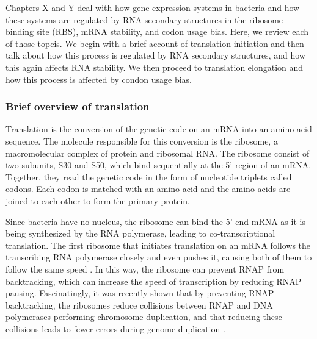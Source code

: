 %
Chapters X and Y deal with how gene expression systems in bacteria and how
these systems are regulated by RNA secondary structures in the ribosome binding
site (RBS), mRNA stability, and codon usage bias. Here, we review each of those
topcis. We begin with a brief account of translation initiation and then talk
about how this process is regulated by RNA secondary structures, and how this
again affects RNA stability. We then proceed to translation elongation and how
this process is affected by condon usage bias.

\subsubsection{Brief overview of translation}
Translation is the conversion of the genetic code on an mRNA into an amino acid
sequence. The molecule responsible for this conversion is the ribosome, a
macromolecular complex of protein and ribosomal RNA. The ribosome consist of
two subunits, S30 and S50, which bind sequentially at the 5' region of an mRNA.
Together, they read the genetic code in the form of nucleotide triplets called
codons. Each codon is matched with an amino acid and the amino acids are joined
to each other to form the primary protein.

Since bacteria have no nucleus, the ribosome can bind the 5' end mRNA as it is
being synthesized by the RNA polymerase, leading to co-transcriptional
translation. The first ribosome that initiates
translation on an mRNA follows the transcribing RNA polymerase closely and even
pushes it, causing both of them to follow the same speed 
\cite{proshkin_cooperation_2010}. In this way, the ribosome can prevent RNAP
from backtracking, which can increase the speed of transcription by reducing
RNAP pausing. Fascinatingly, it was recently shown that by preventing RNAP
backtracking, the ribosomes reduce collisions between RNAP and DNA polymerases
performing chromosome duplication, and that reducing these collisions leads to
fewer errors during genome duplication \cite{dutta_linking_2011}.

